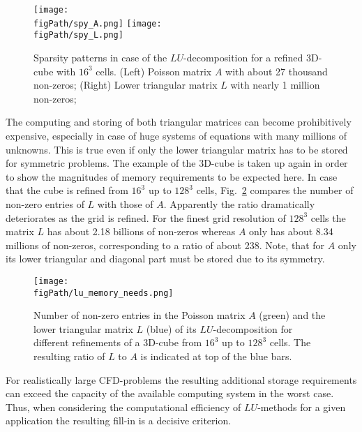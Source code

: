 \begin{figure}[ht]
\begin{center}
\texttt{[image: \\figPath/spy\_A.png]}\qquad\qquad\qquad
\texttt{[image: \\figPath/spy\_L.png]}\\
\end{center}
\caption[Sparsity patterns in case of a $LU$-decomposition for a refined 3D-cube with $16^3$ cells]{
Sparsity patterns in case of the $LU$-decomposition for a refined 3D-cube with $16^3$ cells.
(Left) Poisson matrix $A$ with about 27 thousand non-zeros; (Right) Lower triangular matrix $L$ with nearly 1 million non-zeros;
}
\label{FIG_SCARC_lu_memory_spy}
\end{figure}

The computing and storing of both triangular matrices can become prohibitively expensive, especially in case of huge systems of equations with many  millions of unknowns. This is true even if only the lower triangular matrix has to be stored for symmetric problems.
The example of the 3D-cube is taken up again in order to show the magnitudes of memory requirements to be expected here.
In case that the cube is refined from $16^3$ up to $128^3$ cells, Fig.~\ref{FIG_SCARC_lu_memory_need} compares
the number of non-zero entries of $L$ with those of $A$. Apparently the ratio dramatically deteriorates as the grid is refined. 
For the finest grid resolution of $128^3$ cells the matrix $L$ has about 2.18 billions %
of non-zeros whereas $A$ only has about 8.34 millions of non-zeros, %
corresponding to a ratio of about 238. Note, that for $A$ only its lower triangular and diagonal part must be stored due to its symmetry.

\begin{figure}[ht]
\centering\texttt{[image: \\figPath/lu\_memory\_needs.png]}\\[2ex]
\caption[Memory needs for the $LU$-decomposition]{
Number of non-zero entries in the Poisson matrix $A$ (green) and the lower triangular matrix $L$ (blue) of its $LU$-decomposition for different refinements of a 3D-cube from $16^3$ up to $128^3$ cells. The resulting ratio of $L$ to  $A$ is indicated at top of the blue bars. 
}
\label{FIG_SCARC_lu_memory_need}
\end{figure}

For realistically large CFD-problems the resulting additional storage requirements can  exceed the capacity of the available computing system in the worst case.
Thus, when considering the computational efficiency of $LU$-methods for a given application the resulting fill-in is a decisive criterion. 


